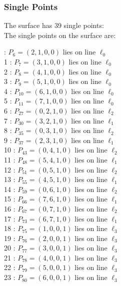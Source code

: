 \documentclass{article}
\begin{document}
{\subsubsection*{Single Points}
The surface has 39 single points:\\
The single points on the surface are:\\
\begin{multicols}{2}
 : $P_{6}=( 2, 1, 0, 0 )$ lies on line $\ell_{0}$\\
1 : $P_{7}=( 3, 1, 0, 0 )$ lies on line $\ell_{0}$\\
2 : $P_{8}=( 4, 1, 0, 0 )$ lies on line $\ell_{0}$\\
3 : $P_{9}=( 5, 1, 0, 0 )$ lies on line $\ell_{0}$\\
4 : $P_{10}=( 6, 1, 0, 0 )$ lies on line $\ell_{0}$\\
5 : $P_{11}=( 7, 1, 0, 0 )$ lies on line $\ell_{0}$\\
6 : $P_{27}=( 0, 2, 1, 0 )$ lies on line $\ell_{2}$\\
7 : $P_{30}=( 3, 2, 1, 0 )$ lies on line $\ell_{1}$\\
8 : $P_{35}=( 0, 3, 1, 0 )$ lies on line $\ell_{2}$\\
9 : $P_{37}=( 2, 3, 1, 0 )$ lies on line $\ell_{1}$\\
10 : $P_{43}=( 0, 4, 1, 0 )$ lies on line $\ell_{2}$\\
11 : $P_{48}=( 5, 4, 1, 0 )$ lies on line $\ell_{1}$\\
12 : $P_{51}=( 0, 5, 1, 0 )$ lies on line $\ell_{2}$\\
13 : $P_{55}=( 4, 5, 1, 0 )$ lies on line $\ell_{1}$\\
14 : $P_{59}=( 0, 6, 1, 0 )$ lies on line $\ell_{2}$\\
15 : $P_{66}=( 7, 6, 1, 0 )$ lies on line $\ell_{1}$\\
16 : $P_{67}=( 0, 7, 1, 0 )$ lies on line $\ell_{2}$\\
17 : $P_{73}=( 6, 7, 1, 0 )$ lies on line $\ell_{1}$\\
18 : $P_{75}=( 1, 0, 0, 1 )$ lies on line $\ell_{3}$\\
19 : $P_{76}=( 2, 0, 0, 1 )$ lies on line $\ell_{3}$\\
20 : $P_{77}=( 3, 0, 0, 1 )$ lies on line $\ell_{3}$\\
21 : $P_{78}=( 4, 0, 0, 1 )$ lies on line $\ell_{3}$\\
22 : $P_{79}=( 5, 0, 0, 1 )$ lies on line $\ell_{3}$\\
23 : $P_{80}=( 6, 0, 0, 1 )$ lies on line $\ell_{3}$\\

\end{multicols}}
\end{document}
